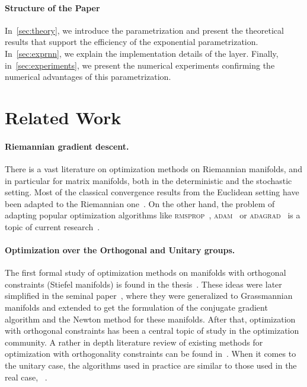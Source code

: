 \paragraph{Structure of the Paper}
In~\ref{sec:theory}, we introduce the parametrization and present the theoretical results that support the efficiency of the exponential parametrization. In~\ref{sec:exprnn}, we explain the implementation details of the layer. Finally, in~\ref{sec:experiments}, we present the numerical experiments confirming the numerical advantages of this parametrization.

\section{Related Work}\label{sec:related}
\paragraph{Riemannian gradient descent.} There is a vast literature on optimization methods on Riemannian manifolds, and in particular for matrix manifolds, both in the deterministic and the stochastic setting. Most of the classical convergence results from the Euclidean setting have been adapted to the Riemannian one~\cite{absil2009optimization,bonnabel2013stochastic,boumal2016global,zhang2016riemannian,sato2017riemannian}. On the other hand, the problem of adapting popular optimization algorithms like \textsc{rmsprop}~\cite{tieleman2012lecture}, \textsc{adam}~\cite{kingma2014adam} or \textsc{adagrad}~\cite{duchi2011adaptive} is a topic of current research~\cite{Roy_2018_CVPR,becigneul2018riemannian}.

\paragraph{Optimization over the Orthogonal and Unitary groups.} The first formal study of optimization methods on manifolds with orthogonal constraints (Stiefel manifolds) is found in the thesis~\cite{Smith:1993:GOM:165579}. These ideas were later simplified in the seminal paper~\cite{edelman1998geometry}, where they were generalized to Grassmannian manifolds and extended to get the formulation of the conjugate gradient algorithm and the Newton method for these manifolds. After that, optimization with orthogonal constraints has been a central topic of study in the optimization community. A rather in depth literature review of existing methods for optimization with orthogonality constraints can be found in~\cite{jiang2015framework}. When it comes to the unitary case, the algorithms used in practice are similar to those used in the real case, \cf~\cite{manton2002optimization,abrudan2008steepest}.

